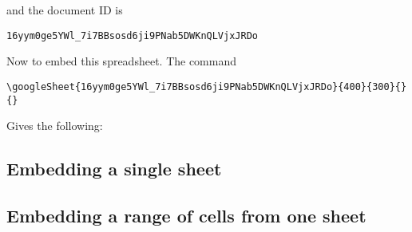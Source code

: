 \documentclass{ximera}
\begin{document}
and the document ID is

\begin{verbatim}
16yym0ge5YWl_7i7BBsosd6ji9PNab5DWKnQLVjxJRDo
\end{verbatim}

Now to embed this spreadsheet. The command

\begin{verbatim}
\googleSheet{16yym0ge5YWl_7i7BBsosd6ji9PNab5DWKnQLVjxJRDo}{400}{300}{}{}
\end{verbatim}

Gives the following:



\subsection{Embedding a single sheet}



\subsection{Embedding a range of cells from one sheet}

\end{document}
